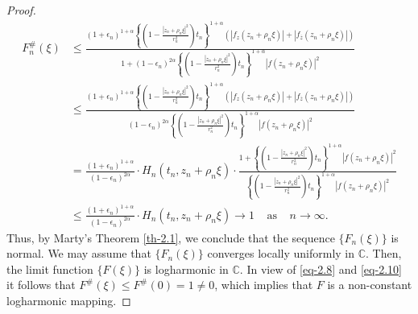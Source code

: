 \documentclass[a4paper,12pt]{amsart}
\theoremstyle{plain}
\theoremstyle{definition}
\begin{document}
\begin{proof}
\begin{align}
	F^{\#}_n(\xi)\nonumber&\leq \frac{(1+\epsilon_n)^{1+\alpha} \left\{\left(1- \frac{|z_n+ \rho_n\xi|^2} {r^2_n}\right)t_n \right\}^{1+\alpha} \left(|f_z(z_n+\rho_n\xi)| + |f_{\overline{z}} (z_n+\rho_n\xi)| \right)}{1+(1-\epsilon_n) ^{2\alpha} \left\{\left(1- \frac{|z_n+ \rho_n\xi|^2}{r^2_n}\right) t_n\right\}^{1+\alpha} |f(z_n+ \rho_n\xi)|^2} \\&\nonumber\leq \frac{(1+\epsilon_n)^{1+\alpha}\left\{\left(1- \frac{|z_n+ \rho_n\xi|^2} {r^2_n}\right)t_n\right\}^{1+\alpha} \left(|f_z(z_n +\rho_n\xi)| + |f_{\overline{z}}(z_n+\rho_n\xi)| \right)}{(1- \epsilon_n)^{2\alpha} \left\{\left(1- \frac{|z_n+ \rho_n\xi|^2} {r^2_n}\right)t_n\right\}^{1+\alpha} |f(z_n+ \rho_n\xi)|^2} \\&\nonumber=\frac{(1+\epsilon_n)^{1+\alpha}}{(1-\epsilon_n)^{2\alpha}} \cdot H_n(t_n, z_n+\rho_n\xi) \cdot \frac{1+ \left\{\left(1- \frac{|z_n+ \rho_n\xi|^2}{r^2_n}\right)t_n\right\}^{1+\alpha} |f(z_n+ \rho_n\xi)|^2}{\left\{\left(1- \frac{|z_n+ \rho_n\xi|^2} {r^2_n}\right)t_n\right\}^{1+\alpha} |f(z_n+ \rho_n\xi)|^2} \\&\leq\frac{(1+\epsilon_n)^{1+\alpha}} {(1-\epsilon_n)^{2\alpha}} \cdot H_n(t_n, z_n+\rho_n\xi) \rightarrow 1 \;\;\;\;\mbox{as} \;\;\;\;n\rightarrow \infty.
\end{align}
Thus, by Marty's Theorem \ref{th-2.1}, we conclude that the sequence $\{F_n(\xi)\}$ is normal. We may assume that $\{F_n(\xi)\}$ converges locally uniformly in $\mathbb{C}$. Then, the limit function $\{F(\xi)\}$ is logharmonic in $\mathbb{C}$. In view of \eqref{eq-2.8}
and \eqref{eq-2.10} it follows that $F^{\#}(\xi)\leq F^{\#}(0)= 1\neq 0$, which implies that $F$ is a non-constant logharmonic mapping. \vspace{2mm}


\end{proof}
\end{document}
